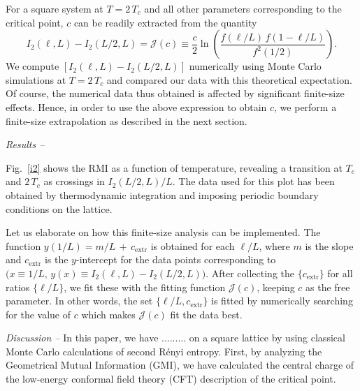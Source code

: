 \documentclass[a4paper,aps,prl,reprint,superscriptaddress,twocolumn,floatfix]{revtex4-1}
\begin{document}
For a square system at $T= 2 \, T_c $ and all other parameters corresponding to the critical point, $c$ can be readily extracted from the quantity
\begin{equation}
\label{c}
 I_2 (\ell, L) - I_2 (L/2 , L)
 =\mathcal{J} (c ) \equiv
\frac{c} {2}
\ln \left(
\frac {  f \left ( \ell / L \right )  \, f \left (1- {  \ell} /L  \right ) }
{  f^2 (1 /2) }
\right ) .
\end{equation}
We compute $ [  I_2 (\ell, L) - I_2 (L/2 , L) ]$ numerically using Monte Carlo simulations
at $T= 2 \, T_c $ and compared our data with this theoretical expectation. 
Of course, the numerical data thus obtained is affected by significant finite-size effects. Hence, in order
to use the above expression to obtain $c$, we perform a finite-size extrapolation as described in the next section.







{\em Results --}

Fig.~\ref{i2} shows the RMI as a function of temperature,
revealing a transition at $T_c$ and $2 \,T_c$ as crossings in $I_2(L/2, L)  /L$.
The data used for this plot has been obtained by thermodynamic integration and imposing periodic boundary conditions on the lattice.

Let us elaborate on how this finite-size analysis can be implemented.
The function $ y(1/L) = m  /L \,  +  \, c_{ \text{extr} } $ is obtained for each $ \ell/L$, where $m$ is the slope
and $ c_{ \text{extr}  }$ is the $y$-intercept for the data points corresponding to $ \Big ( x\equiv 1/L , \, y(x) \equiv  I_2 (\ell, L) - I_2 (L/2 , L) \Big  )$. 
After collecting the $\lbrace c_{ \text{extr} } \rbrace $ for all ratios $\lbrace \ell/L \rbrace$, we fit
these with the fitting function $\mathcal{J}(c )$, keeping $c$ as the free parameter.
In other words, the set $\lbrace \ell/L, c_{ \text{extr} } \rbrace$ is fitted by numerically searching for the value of $c$ which makes $\mathcal{J}(c )$ fit the data best.





 










{\em Discussion --}
In this paper, we have ......... on a square lattice by using classical Monte Carlo calculations of second R{\'e}nyi entropy.  
First, by analyzing the Geometrical Mutual Information (GMI), 
we have calculated the central charge of the low-energy conformal field theory (CFT) 
description of the critical point.
\end{document}
